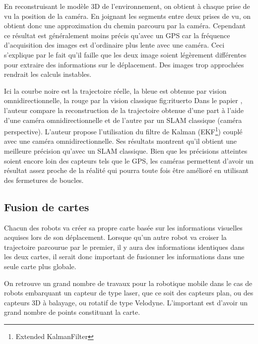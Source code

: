 En reconstruisant le modèle 3D de l'environnement, on obtient à chaque prise de vu la position de la caméra.
En joignant les segments entre deux prises de vu, on obtient donc une approximation du chemin parcouru par la caméra.
Cependant ce résultat est généralement moins précis qu'avec un GPS car la fréquence d'acquisition des images est d'ordinaire plus lente avec une caméra.
Ceci s'explique par le fait qu'il faille que les deux image soient légèrement différentes pour extraire des informations sur le déplacement.
Des images trop approchées rendrait les calculs instables.

 {Ici la courbe noire est la trajectoire réelle, la bleue est obtenue par vision omnidirectionnelle, la rouge par la vision classique} {fig:rituerto}
Dans le papier \cite{Rituerto10}, l'auteur compare  la reconstruction de la trajectoire obtenue d'une part à l'aide d'une caméra omnidirectionnelle et de l'autre par un SLAM classique (caméra perspective).
L'auteur propose l'utilisation du filtre de Kalman (EKF\footnote{Extended KalmanFilter}) couplé avec une caméra omnidirectionnelle.
Ses résultats montrent qu'il obtient une meilleure précision qu'avec un SLAM classique.
Bien que les précisions atteintes soient encore loin des capteurs tels que le GPS, les caméras permettent d'avoir un résultat assez proche de la réalité qui pourra toute fois être amélioré en utilisant des fermetures de boucles.


\subsection{Fusion de cartes}

Chacun des robots va créer sa propre carte basée sur les informations visuelles acquises lors de son déplacement.
Lorsque qu'un autre robot va croiser la trajectoire parcourue par le premier, il y aura des informations identiques dans les deux cartes, il serait donc important de fusionner les informations dans une seule carte plus globale.

On retrouve un grand nombre de travaux pour la robotique mobile dans le cas de robots embarquant un capteur de type laser, que ce soit des capteurs plan, ou des capteurs 3D à balayage, ou rotatif de type Velodyne.
L'important est d'avoir un grand nombre de points constituant la carte.

